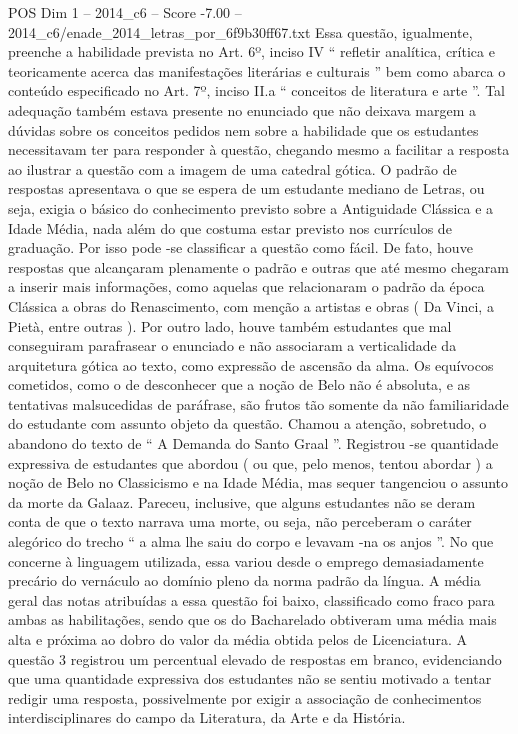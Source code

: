 \begin{textsample}{POS Dim 1 – 2014\_c6 – Score -7.00 – 2014\_c6/enade\_2014\_letras\_por\_6f9b30ff67.txt}
Essa questão, igualmente, preenche a habilidade prevista no Art. 6º, inciso IV “ refletir analítica, crítica e teoricamente acerca das manifestações literárias e culturais ” bem como abarca o conteúdo especificado no Art. 7º, inciso II.a “ conceitos de literatura e arte ”.
Tal adequação também estava presente no enunciado que não deixava margem a dúvidas sobre os conceitos pedidos nem sobre a habilidade que os estudantes necessitavam ter para responder à questão, chegando mesmo a facilitar a resposta ao ilustrar a questão com a imagem de uma catedral gótica.
O padrão de respostas apresentava o que se espera de um estudante mediano de Letras, ou seja, exigia o básico do conhecimento previsto sobre a Antiguidade Clássica e a Idade Média, nada além do que costuma estar previsto nos currículos de graduação.
Por isso pode -se classificar a questão como fácil.
De fato, houve respostas que alcançaram plenamente o padrão e outras que até mesmo chegaram a inserir mais informações, como aquelas que relacionaram o padrão da época Clássica a obras do Renascimento, com menção a artistas e obras ( Da Vinci, a Pietà, entre outras ).
Por outro lado, houve também estudantes que mal conseguiram parafrasear o enunciado e não associaram a verticalidade da arquitetura gótica ao texto, como expressão de ascensão da alma.
Os equívocos cometidos, como o de desconhecer que a noção de Belo não é absoluta, e as tentativas malsucedidas de paráfrase, são frutos tão somente da não familiaridade do estudante com assunto objeto da questão.
Chamou a atenção, sobretudo, o abandono do texto de “ A Demanda do Santo Graal ”.
Registrou -se quantidade expressiva de estudantes que abordou ( ou que, pelo menos, tentou abordar ) a noção de Belo no Classicismo e na Idade Média, mas sequer tangenciou o assunto da morte da Galaaz.
Pareceu, inclusive, que alguns estudantes não se deram conta de que o texto narrava uma morte, ou seja, não perceberam o caráter alegórico do trecho “ a alma lhe saiu do corpo e levavam -na os anjos ”.
No que concerne à linguagem utilizada, essa variou desde o emprego demasiadamente precário do vernáculo ao domínio pleno da norma padrão da língua.
A média geral das notas atribuídas a essa questão foi baixo, classificado como fraco para ambas as habilitações, sendo que os do Bacharelado obtiveram uma média mais alta e próxima ao dobro do valor da média obtida pelos de Licenciatura.
A questão 3 registrou um percentual elevado de respostas em branco, evidenciando que uma quantidade expressiva dos estudantes não se sentiu motivado a tentar redigir uma resposta, possivelmente por exigir a associação de conhecimentos interdisciplinares do campo da Literatura, da Arte e da História.

\end{textsample}

